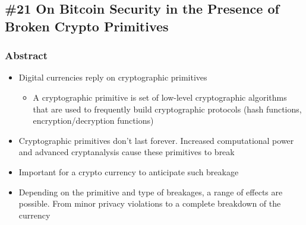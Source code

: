 \subsection*{\#21 On Bitcoin Security in the Presence of Broken Crypto Primitives}
\subsubsection{Abstract}
\begin{itemize}
	\item Digital currencies reply on cryptographic primitives
	\begin{itemize}
		\item A cryptographic primitive is set of low-level cryptographic algorithms that are used to frequently build cryptographic protocols (hash functions, encryption/decryption functions)
	\end{itemize}
	\item Cryptographic primitives don't last forever. Increased computational power and advanced cryptanalysis cause these primitives to break
	\item Important for a crypto currency to anticipate such breakage
	\item Depending on the primitive and type of breakages, a range of effects are possible. From minor privacy violations to a complete breakdown of the currency
\end{itemize}